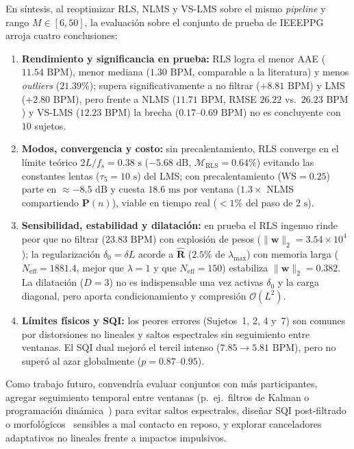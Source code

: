 \documentclass[conference]{IEEEtran}
\begin{document}
En síntesis, al reoptimizar RLS, NLMS y VS-LMS sobre el mismo \textit{pipeline} y rango $M\in[6,50]$, la evaluación sobre el conjunto de prueba de IEEEPPG arroja cuatro conclusiones:
\begin{enumerate}
    \item \textbf{Rendimiento y significancia en prueba:} RLS logra el menor AAE ($11.54\text{ BPM}$), menor mediana ($1.30\text{ BPM}$, comparable a la literatura) y menos \textit{outliers} ($21.39\%$); supera significativamente a no filtrar ($+8.81\text{ BPM}$) y LMS ($+2.80\text{ BPM}$), pero frente a NLMS ($11.71\text{ BPM}$, RMSE $26.22$ vs.\ $26.23\text{ BPM}$) y VS-LMS ($12.23\text{ BPM}$) la brecha ($0.17$--$0.69\text{ BPM}$) no es concluyente con $10$ sujetos.
    \item \textbf{Modos, convergencia y costo:} sin precalentamiento, RLS converge en el límite teórico $2L/f_s=0.38\text{ s}$ ($-5.68\text{ dB}$, $\mathcal{M}_{\text{RLS}}=0.64\%$) evitando las constantes lentas ($\tau_5=10\text{ s}$) del LMS; con precalentamiento ($\text{WS}=0.25$) parte en $\approx -8.5\text{ dB}$ y cuesta $18.6\text{ ms}$ por ventana ($1.3\times$ NLMS compartiendo $\mathbf{P}(n)$), viable en tiempo real ($<1\%$ del paso de $2\text{ s}$).
    \item \textbf{Sensibilidad, estabilidad y dilatación:} en prueba el RLS ingenuo rinde peor que no filtrar ($23.83\text{ BPM}$) con explosión de pesos ($\lVert\mathbf{w}\rVert_2=3.54\times 10^4$); la regularización $\delta_0=\delta L$ acorde a $\hat{\mathbf{R}}$ ($2.5\%$ de $\lambda_{\max}$) con memoria larga ($N_{\text{eff}}=1881.4$, mejor que $\lambda=1$ y que $N_{\text{eff}}=150$) estabiliza $\lVert\mathbf{w}\rVert_2=0.382$. La dilatación ($D=3$) no es indispensable una vez activas $\delta_0$ y la carga diagonal, pero aporta condicionamiento y compresión $\mathcal{O}(L^2)$.
    \item \textbf{Límites físicos y SQI:} los peores errores (Sujetos~1, 2, 4 y~7) son comunes por distorsiones no lineales y saltos espectrales sin seguimiento entre ventanas. El SQI dual mejoró el tercil intenso ($7.85\to 5.81\text{ BPM}$), pero no superó al azar globalmente ($p=0.87$--$0.95$).
\end{enumerate}

Como trabajo futuro, convendría evaluar conjuntos con más participantes, agregar seguimiento temporal entre ventanas (p.\ ej.\ filtros de Kalman o programación dinámica~\cite{zhang2015troika}) para evitar saltos espectrales, diseñar SQI post-filtrado o morfológicos~\cite{elgendi2016sqi} sensibles a mal contacto en reposo, y explorar canceladores adaptativos no lineales frente a impactos impulsivos.



\end{document}
